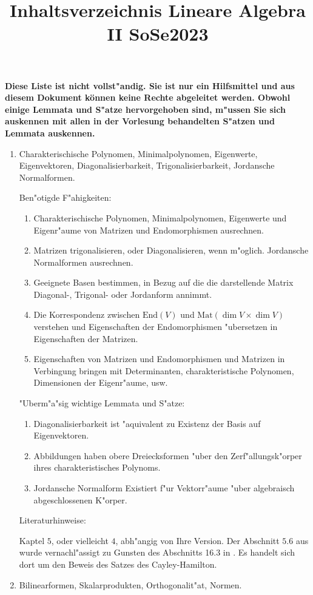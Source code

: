 \documentclass[a4paper]{article}
\title{Inhaltsverzeichnis Lineare Algebra II SoSe2023}
\begin{document}
\maketitle

\textbf{Diese Liste ist nicht vollst"andig. Sie ist nur ein Hilfsmittel und aus diesem Dokument können keine Rechte abgeleitet werden. Obwohl einige Lemmata und S"atze hervorgehoben sind, m"ussen Sie sich auskennen mit allen in der Vorlesung behandelten S"atzen und Lemmata auskennen.}

\begin{enumerate}
\item
Charakterischische Polynomen, Minimalpolynomen, Eigenwerte, Eigenvektoren, Diagonalisierbarkeit, Trigonalisierbarkeit, Jordansche Normalformen.

Ben"otigde F"ahigkeiten:
\begin{enumerate}
\item
Charakterischische Polynomen, Minimalpolynomen, Eigenwerte und Eigenr"aume von Matrizen und Endomorphismen ausrechnen.
\item
Matrizen trigonalisieren, oder Diagonalisieren, wenn m"oglich. Jordansche Normalformen ausrechnen.
\item
Geeignete Basen bestimmen, in Bezug auf die die darstellende Matrix Diagonal-, Trigonal- oder Jordanform annimmt.
\item
Die Korrespondenz zwischen $\text{End}(V)$ und $\text{Mat}(\dim V \times \dim V)$ verstehen und Eigenschaften der Endomorphismen "ubersetzen in Eigenschaften der Matrizen.
\item
Eigenschaften von Matrizen und Endomorphismen und Matrizen in Verbingung bringen mit Determinanten, charakteristische Polynomen, Dimensionen der Eigenr"aume, usw.
\end{enumerate}

"Uberm"a"sig wichtige Lemmata und S"atze:
\begin{enumerate}
\item
Diagonalisierbarkeit ist "aquivalent zu Existenz der Basis auf Eigenvektoren.
\item
Abbildungen haben obere Dreiecksformen "uber den Zerf"allungsk"orper ihres charakteristisches Polynoms.
\item
Jordansche Normalform Existiert f"ur Vektorr"aume "uber algebraisch abgeschlossenen K"orper.
\end{enumerate}

Literaturhinweise:

\cite{FS} Kaptel $5$, oder vielleicht $4$, abh"angig von Ihre Version. Der Abschnitt $5.6$ aus \cite{FS} wurde vernachl"assigt zu Gunsten des Abschnitts 16.3 in \cite{G}. Es handelt sich dort um den Beweis des Satzes des Cayley-Hamilton.
\item
Bilinearformen, Skalarprodukten, Orthogonalit"at, Normen.


\end{enumerate}
\end{document}
